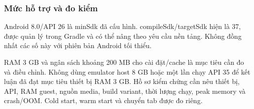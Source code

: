 \subsubsection{Mức hỗ trợ và đo kiểm}
\label{sec:min-config}

Android 8.0/API 26 là minSdk đã cấu hình. compileSdk/targetSdk hiện là 37, được quản lý trong Gradle và có thể nâng theo yêu cầu nền tảng. Không đồng nhất các số này với phiên bản Android tối thiểu.

RAM 3 GB và ngân sách khoảng 200 MB cho cài đặt/cache là mục tiêu cần đo và điều chỉnh. Không dùng emulator host 8 GB hoặc một lần chạy API 35 để kết luận đã đạt mục tiêu thiết bị RAM 3 GB. Hồ sơ kiểm chứng cần nêu thiết bị, API, RAM guest, nguồn media, build variant, thời lượng chạy, peak memory và crash/OOM. Cold start, warm start và chuyển tab được đo riêng.
